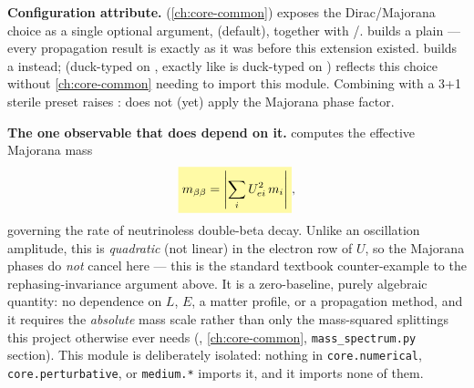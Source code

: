 \begin{theorybox}
\textbf{Configuration attribute.}
(\cref{ch:core-common}) exposes the Dirac/Majorana choice as a single
optional argument, 
(default)\allowbreak{}\code{\}}, together with
/.  builds a plain
 --- every propagation result is exactly as it was before
this extension existed.  builds a 
instead; 
(duck-typed on , exactly like
 is duck-typed on ) reflects this
choice without \cref{ch:core-common} needing to import this module.
Combining  with a 3+1 sterile preset
raises :  does not (yet) apply the
Majorana phase factor.

\textbf{The one observable that does depend on it.}
 computes the effective Majorana mass
\begin{equation}
  \keyresult{m_{\beta\beta} = \left|\sum_i U_{ei}^2\,m_i\right|},
\end{equation}
governing the rate of neutrinoless double-beta decay. Unlike an
oscillation amplitude, this is \emph{quadratic} (not linear) in the
electron row of $U$, so the Majorana phases do \emph{not} cancel here ---
this is the standard textbook counter-example to the rephasing-invariance
argument above. It is a zero-baseline, purely algebraic quantity: no
dependence on $L$, $E$, a matter profile, or a propagation method, and it
requires the \emph{absolute} mass scale rather than only the mass-squared
splittings this project otherwise ever needs
(,
\cref{ch:core-common}, \texttt{mass\_spectrum.py} section). This module is
deliberately isolated: nothing in \texttt{core.numerical},
\texttt{core.perturbative}, or \texttt{medium.*} imports it, and it imports
none of them.
\end{theorybox}

